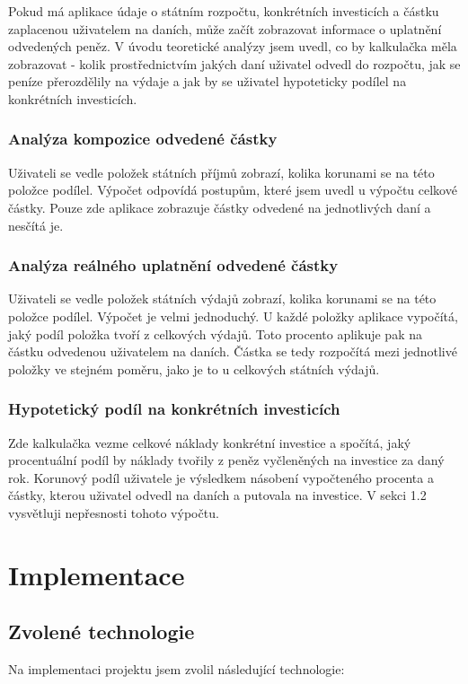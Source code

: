 \documentclass[11pt,a4paper,twoside,openright]{report}
\begin{document}
Pokud má aplikace údaje o státním rozpočtu, konkrétních investicích a částku zaplacenou uživatelem na daních, může začít zobrazovat informace o uplatnění odvedených peněz. V úvodu teoretické analýzy jsem uvedl, co by kalkulačka měla zobrazovat - kolik prostřednictvím jakých daní uživatel odvedl do rozpočtu, jak se peníze přerozdělily na výdaje a jak by se uživatel hypoteticky podílel na konkrétních investicích.

\subsection{Analýza kompozice odvedené částky}

Uživateli se vedle položek státních příjmů zobrazí, kolika korunami se na této položce podílel. Výpočet odpovídá postupům, které jsem uvedl u výpočtu celkové částky. Pouze zde aplikace zobrazuje částky odvedené na jednotlivých daní a nesčítá je.

\subsection{Analýza reálného uplatnění odvedené částky}

Uživateli se vedle položek státních výdajů zobrazí, kolika korunami se na této položce podílel. Výpočet je velmi jednoduchý. U každé položky aplikace vypočítá, jaký podíl položka tvoří z celkových výdajů. Toto procento aplikuje pak na částku odvedenou uživatelem na daních. Částka se tedy rozpočítá mezi jednotlivé položky ve stejném poměru, jako je to u celkových státních výdajů.

\subsection{Hypotetický podíl na konkrétních investicích}

Zde kalkulačka vezme celkové náklady konkrétní investice a spočítá, jaký procentuální podíl by náklady tvořily z peněz vyčleněných na investice za daný rok. Korunový podíl uživatele je výsledkem násobení vypočteného procenta a částky, kterou uživatel odvedl na daních a putovala na investice. V sekci 1.2 vysvětluji nepřesnosti tohoto výpočtu.

\chapter{Implementace}

\section{Zvolené technologie}
Na implementaci projektu jsem zvolil následující technologie:
\end{document}
